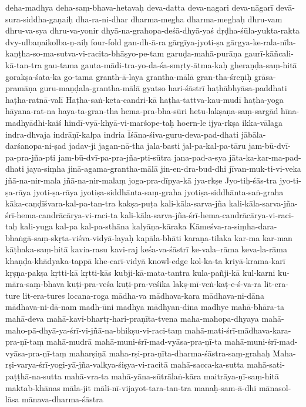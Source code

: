 {deha-madhya
deha-saṃ-bhava-hetavaḥ
deva-datta
deva-nagari
deva-nāgarī
devā-sura-siddha-gaṇaiḥ
dha-ra-ni-dhar
dharma-megha
dharma-meghaḥ
dhru-vam
dhru-va-sya
dhru-va-yonir
dhyā-na-grahopa-deśā-dhyā-yaś
dṛḍha-śūla-yukta-rakta
dvy-ulbaṇaikolba-ṇ-aiḥ
four-fold
gan-dh-ā-ra
gārgīya-jyoti-ṣa
gārgya-ke-rala-nīla-kaṇṭha-so-ma-sutva-vi-racita-bhāṣyo-pe-tam
garuḍa-mahā-purāṇa
gaurī-kāñcali-kā-tan-tra
gau-tama
gauta-mādi-tra-yo-da-śa-smṛty-ātma-kaḥ
gheraṇḍa-saṃ-hitā
gorakṣa-śata-ka
go-tama
granth-ā-laya
grantha-mālā
gran-tha-śreṇiḥ
grāsa-pramāṇa
guru-maṇḍala-grantha-mālā
gyatso
hari-śāstrī
haṭhābhyāsa-paddhati
haṭha-ratnā-valī
Haṭha-saṅ-keta-candri-kā
haṭha-tattva-kau-mudī
haṭha-yoga
hāyana-rat-na
haya-ta-gran-tha
hema-pra-bha-sūri
hetu-lakṣaṇa-saṃ-sargād
hīna-madhyādhi-kaiś
hindī-vyā-khyā-vi-marśope-taḥ
hoern-le
ijya-rkṣa
ikka-vālaga
indra-dhvaja
indrāṇī-kalpa
indria
Īśāna-śiva-guru-deva-pad-dhati
jābāla-darśanopa-ni-ṣad
jadav-ji
jagan-nā-tha
jala-basti
jal-pa-kal-pa-tāru
jam-bū-dvī-pa-pra-jña-pti
jam-bū-dvī-pa-pra-jña-pti-sūtra
jana-pad-a-sya
jāta-ka-kar-ma-pad-dhati
jaya-siṃha
jinā-agama-grantha-mālā
jin-en-dra-bud-dhi
jīvan-muk-ti-vi-veka
jñā-na-nir-mala
jñā-na-nir-malaṃ
joga-pra-dīpya-kā
jya-rkṣe
Jyo-tiḥ-śās-tra
jyo-ti-ṣa-rāya
jyoti-ṣa-rāya
jyotiṣa-siddhānta-saṃ-graha
jyotiṣa-siddhānta-saṅ-graha
kāka-caṇḍīśvara-kal-pa-tan-tra
kakṣa-puṭa
kali-kāla-sarva-jña
kali-kāla-sarva-jña-śrī-hema-candrācārya-vi-raci-ta
kali-kāla-sarva-jña-śrī-hema-candrācārya-vi-raci-taḥ
kali-yuga
kal-pa
kal-pa-sthāna
kalyāṇa-kāraka
Kāmeśva-ra-siṃha-dara-bhaṅgā-saṃ-skṛta-viśva-vidyā-layaḥ
kapāla-bhāti
karaṇa-tilaka
kar-ma
kar-man
kāṭhaka-saṃ-hitā
kavia-rasu
kavi-raj
keśa-va-śāstrī
ke-vala--rāma
keva-la-rāma
khaṇḍa-khādyaka-tappā
khe-carī-vidyā
knowl-edge
kol-ka-ta
kriyā-krama-karī
kṛṣṇa-pakṣa
kṛtti-kā
kṛtti-kās
kubji-kā-mata-tantra
kula-pañji-kā
kul-karni
ku-māra-saṃ-bhava
kuṭi-pra-veśa
kuṭi-pra-veśika
lakṣ-mī-veṅ-kaṭ-e-ś-va-ra
lit-era-ture
lit-era-tures
locana-roga
mādha-va
mādhava-kara
mādhava-ni-dāna
mādhava-ni-dā-nam
madh-ūni
madhya
mādhyan-dina
madhye
mahā-bhāra-ta
mahā-deva
mahā-kavi-bhartṛ-hari-praṇīta-tvena
maha-mahopa-dhyaya
mahā-maho-pā-dhyā-ya-śrī-vi-jñā-na-bhikṣu-vi-raci-taṃ
mahā-mati-śrī-mādhava-kara-pra-ṇī-taṃ
mahā-mudrā
mahā-muni-śrī-mad-vyāsa-pra-ṇī-ta
mahā-muni-śrī-mad-vyāsa-pra-ṇī-taṃ
maharṣiṇā
maha-rṣi-pra-ṇīta-dharma-śāstra-saṃ-grahaḥ
Maha-rṣi-varya-śrī-yogi-yā-jña-valkya-śiṣya-vi-racitā
mahā-sacca-ka-sutta
mahā-sati-paṭṭhā-na-sutta
mahā-vra-ta
mahā-yāna-sūtrālaṅ-kāra
maitrāya-ṇī-saṃ-hitā
maktab-khānas
māla-jit
māli-nī-vijayot-tara-tan-tra
manaḥ-sam-ā-dhi
mānasol-lāsa
mānava-dharma-śāstra
}
